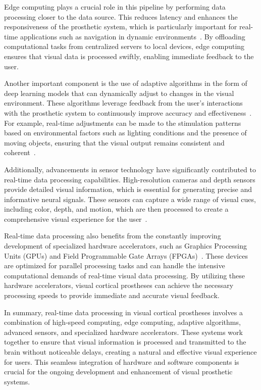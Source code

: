 \documentclass[twocolumn,10pt]{article}
\begin{document}
Edge computing plays a crucial role in this pipeline by performing data
processing closer to the data source. This reduces latency and enhances the
responsiveness of the prosthetic system, which is particularly important for
real-time applications such as navigation in dynamic
environments~\parencite{wangDeepLearningEdge2020}. By offloading computational
tasks from centralized servers to local devices, edge computing ensures that
visual data is processed swiftly, enabling immediate feedback to the user.

Another important component is the use of adaptive algorithms in the form of
deep learning models that can dynamically adjust to changes in the visual
environment. These algorithms leverage feedback from the user's interactions
with the prosthetic system to continuously improve accuracy and
effectiveness~\parencite{pio-lopezVisualCorticalProsthesis2021b}. For example,
real-time adjustments can be made to the stimulation patterns based on
environmental factors such as lighting conditions and the presence of moving
objects, ensuring that the visual output remains consistent and
coherent~\parencite{fylstraHumanprosthesisCooperationCombining2022}.

Additionally, advancements in sensor technology have significantly contributed
to real-time data processing capabilities. High-resolution cameras and depth
sensors provide detailed visual information, which is essential for generating
precise and informative neural signals. These sensors can capture a wide range
of visual cues, including color, depth, and motion, which are then processed to
create a comprehensive visual experience for the
user~\parencite{rueckauerExperiencingProstheticVision2022}.

Real-time data processing also benefits from the constantly improving development of specialized
hardware accelerators, such as Graphics Processing Units (GPUs) and Field
Programmable Gate Arrays
(FPGAs)~\parencite{springerOnDeviceDeepLearning2021,fengDesignOnlineBrainComputer2020}.
These devices are optimized for parallel processing tasks and can handle the
intensive computational demands of real-time visual data processing. By
utilizing these hardware accelerators, visual cortical prostheses can achieve
the necessary processing speeds to provide immediate and accurate visual
feedback.

In summary, real-time data processing in visual cortical prostheses involves a
combination of high-speed computing, edge computing, adaptive algorithms,
advanced sensors, and specialized hardware accelerators. These systems work
together to ensure that visual information is processed and transmitted to the
brain without noticeable delays, creating a natural and effective visual
experience for users. This seamless integration of hardware and software
components is crucial for the ongoing development and enhancement of visual
prosthetic systems.
\end{document}
